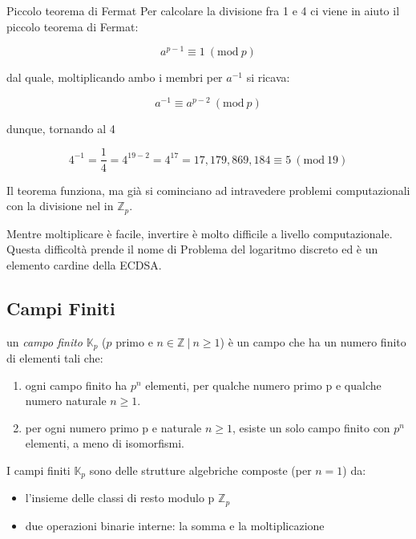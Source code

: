\documentclass{book}
\theoremstyle{definition}
\newcommand{\Mod}[1]{\ (\mathrm{mod}\ #1)}
\newcommand{\Kp}{\mathbb{K}_{p}}
\newcommand{\Zp}{\mathbb{Z}_{p}}
\begin{document}
\subsubsection{}{Piccolo teorema di Fermat}
Per calcolare la divisione fra 1 e 4 ci viene in aiuto il piccolo teorema di Fermat:

\begin{equation}
    a^{p-1} \equiv 1 \Mod{p} \label{piccolo_teorema_di_fermat}
\end{equation}

dal quale, moltiplicando ambo i membri per $a^{-1}$ si ricava:

\begin{equation}
    a^{-1} \equiv a^{p-2} \Mod{p} \label{piccolo_teorema_di_fermat}
\end{equation}

dunque, tornando al 4

$$
4^{-1} = \frac{1}{4} = 4^{19-2} = 4^{17} = 17,179,869,184 \equiv 5 \Mod{19}
$$

Il teorema funziona, ma già si cominciano ad intravedere problemi computazionali con la divisione nel in $\Zp$.

Mentre moltiplicare è facile, invertire è molto difficile a livello computazionale. 
Questa difficoltà prende il nome di Problema del logaritmo discreto ed è un elemento cardine della ECDSA.

\subsection{Campi Finiti}
un \textit{campo finito} $\Kp$ ($p$ primo e $n \in \mathbb{Z} \ | \ n \ge 1$) è un campo che ha un numero finito di elementi tali che:

\begin{enumerate}
    \item ogni campo finito ha $p^{n}$ elementi, per qualche numero primo p e qualche numero naturale $n \ge 1$.
    \item per ogni numero primo p e naturale $n \ge 1$, esiste un solo campo finito con $p^{n}$ elementi, a meno di isomorfismi.
\end{enumerate}

I campi finiti $\Kp$ sono delle strutture algebriche composte (per $n = 1$) da:

\begin{itemize}
    \item l'insieme delle classi di resto modulo p $\Zp$
    \item due operazioni binarie interne: la somma e la moltiplicazione
\end{itemize}
\end{document}

